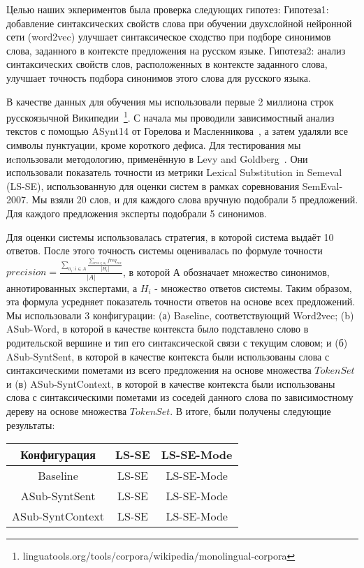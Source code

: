 \documentclass[oneside,senior,etd]{BYUPhys}
\begin{document}
Целью наших экпериментов была проверка следующих гипотез:
Гипотеза1: добавление синтаксических свойств слова при обучении двухслойной нейронной сети (word2vec) улучшает синтаксическое сходство при подборе синонимов слова, заданного в контексте предложения на русском языке. 
Гипотеза2: анализ синтаксических свойств слов, расположенных в контексте заданного слова, улучшает точность подбора синонимов этого слова для русского языка.

В качестве данных для обучения мы использовали первые 2 миллиона строк русскоязычной Википедии~\footnote{linguatools.org/tools/corpora/wikipedia/monolingual-corpora}. С начала мы проводили зависимостный анализ текстов с помощью ASynt14 от Горелова и Масленникова~, а затем удаляли все символы пунктуации, кроме короткого дефиса. Для тестирования мы иcпользовали методологию, применённую в Levy and Goldberg~. Они использовали показатель точности из метрики Lexical Substitution in Semeval (LS-SE), использованную для оценки систем в рамках соревнования SemEval-2007. Мы взяли 20 слов, и для каждого слова вручную подобрали 5 предложений. Для каждого предложения эксперты подобрали 5 синонимов. 

Для оценки системы использовалась стратегия, в которой система выдаёт 10 ответов. После этого точность системы оценивалась по формуле точности 
$precision = \frac{\sum_{a_i:i \in A} \frac{\sum_{res \in a_i} freq_{res}} {|H_i|} } {|A|}$, в которой А обозначает множество синонимов, аннотированных экспертами, а $H_i$ - множество ответов системы. Таким образом, эта формула усредняет показатель точности ответов на основе всех предложений. Мы использовали 3 конфигурации: (а) Baseline, соответствующий Word2vec; (b) ASub-Word, в которой в качестве контекста было подставлено слово в родительской вершине и тип его синтаксической связи с текущим словом; и (б) ASub-SyntSent, в которой в качестве контекста были использованы слова с синтаксическими пометами из всего предложения на основе множества $TokenSet$ и (в) ASub-SyntContext, в которой в качестве контекста были использованы слова с синтаксическими пометами из соседей данного слова по зависимостному дереву на основе множества $TokenSet$.   В итоге, были получены следующие результаты:

\begin{tabular}{ | c | c | c | }
\hline Конфигурация & LS-SE & LS-SE-Mode \\
\hline Baseline & LS-SE & LS-SE-Mode \\
\hline ASub-SyntSent & LS-SE & LS-SE-Mode \\
\hline ASub-SyntContext & LS-SE & LS-SE-Mode \\
\end{tabular}
\end{document}
